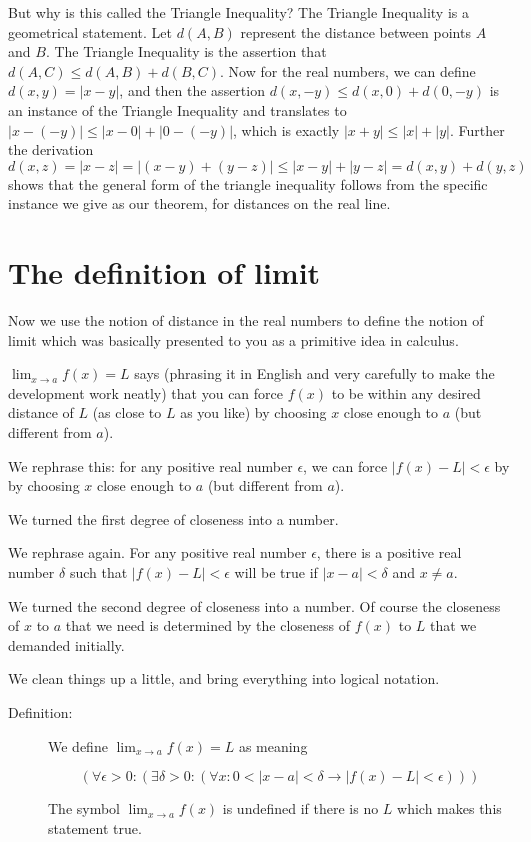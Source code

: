 \documentclass[12pt]{article}
\begin{document}
But why is this called the Triangle Inequality?  The Triangle Inequality is a geometrical statement.  Let $d(A,B)$ represent the distance between points $A$ and $B$.  The Triangle Inequality is the assertion that $d(A,C) \leq d(A,B) + d(B,C)$.  Now for the real numbers, we can define $d(x,y) = |x-y|$, and then the assertion $d(x,-y) \leq d(x,0) + d(0,-y)$ is an instance of the Triangle Inequality and translates to $|x-(-y)| \leq |x-0|+|0-(-y)|$, which is exactly 
$|x+y| \leq |x|+|y|$.   Further the derivation $d(x,z) = |x-z| = |(x-y)+(y-z)| \leq |x-y| + |y-z| = d(x,y) + d(y,z)$ shows that the general form of the triangle inequality follows from the specific instance we give as our theorem, for distances on the real line.

\newpage

\section{The definition of limit}

Now we use the notion of distance in the real numbers to define the notion of limit which was basically presented to you as a primitive idea in calculus.

$\lim_{x \rightarrow a}f(x) = L$ says (phrasing it in English and very carefully to make the development work neatly)
that you can force $f(x)$ to be within any desired distance of $L$ (as close to $L$ as you like) by choosing $x$ close enough to $a$ (but different from $a$).

We rephrase this:  for any positive real number $\epsilon$, we can force $|f(x)-L|<\epsilon$ by by choosing $x$ close enough to $a$ (but different from $a$).

We turned the first degree of closeness into a number.

We rephrase again.  For any positive real number $\epsilon$, there is a positive real number $\delta$ such that $|f(x)-L|<\epsilon$ will be true if $|x-a|<\delta$ and $x \neq a$.

We turned the second degree of closeness into a number.  Of course the closeness of $x$ to $a$ that we need is determined by the closeness of $f(x)$ to $L$ that we demanded initially.

We clean things up a little, and bring everything into logical notation.

\begin{description}

\item[Definition:]  We define $\lim_{x \rightarrow a}f(x) = L$ as meaning

$$(\forall \epsilon>0:(\exists \delta >0:(\forall x:0<|x-a|<\delta \rightarrow |f(x)-L|<\epsilon)))$$

The symbol $\lim_{x \rightarrow a}f(x)$ is undefined if there is no $L$ which makes this statement true.

\end{description}
\end{document}
